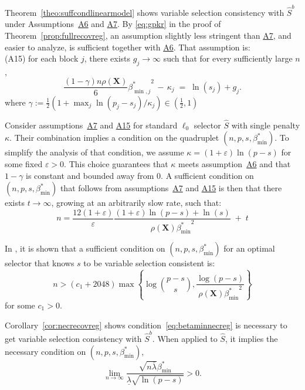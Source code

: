 \documentclass[bj,authoryear]{imsart}
\theoremstyle{plain}
\newcommand{\bs}{\boldsymbol}
\begin{document}
Theorem~\ref{theo:suffcondlinearmodel} shows variable selection consistency with $\hat{S}^b$ under Assumptions~\hyperlink{lab:A6}{A6} and \hyperlink{lab:A7}{A7}. By \eqref{eq:gpkr} in the proof of Theorem~\ref{prop:fullrecovreg}, an assumption slightly less stringent than \hyperlink{lab:A7}{A7}, and easier to analyze, is sufficient together with \hyperlink{lab:A6}{A6}. That assumption is: \\[5pt]
\noindent\hypertarget{lab:A15}{(A15)} \quad for each block $j$, there exists $g_j\to \infty$ such that for every sufficiently large $n$,
    \begin{equation*}
        \frac{(1-\gamma) n\rho(\bs X)}{6}{\beta_{\min,j}^*}^2 \,- \,\kappa_j \;=\; \ln(s_j) + g_j .
    \end{equation*}
where $\gamma:=\tfrac12(1+\max_j\ln(p_j-s_j)/\kappa_j)\in (\tfrac12,1)$

Consider assumptions~\hyperlink{lab:A7}{A7} and \hyperlink{lab:A15}{A15} for standard $\ell_0$ selector $\hat{S}$ with single penalty $\kappa$. Their combination implies a condition on the quadruplet $(n,p,s,\beta_{\min}^*)$. To simplify the analysis of that condition, we assume $\kappa=(1+\varepsilon)\ln(p-s)$ for some fixed $\varepsilon>0$. This choice guarantees that $\kappa$ meets assumption~\hyperlink{lab:A6}{A6} and that $1-\gamma$ is constant and bounded away from 0. A sufficient condition on $(n,p,s,\beta_{\min}^*)$ that follows from assumptions~\hyperlink{lab:A7}{A7} and \hyperlink{lab:A15}{A15} is then that there exists $t\to \infty$, growing at an arbitrarily slow rate, such that:
\begin{equation}\label{eq:groh}
    n= \frac{12(1+\varepsilon)}{\varepsilon}\frac{(1+\varepsilon)\ln(p-s)+\ln(s)}{\rho(\bs X){\beta_{\min}^*}^2} \;+\;t
\end{equation}

In \cite{infotheowainwright}, it is shown that a sufficient condition on $(n,p,s,\beta_{\min}^*)$ for an optimal selector that knows $s$ to be variable selection consistent is:
\begin{equation}\label{eq:groh2}
    n > (c_1+2048) \max \left\{\log \binom{p-s}{s}, \frac{\log (p-s)}{\rho(\bs X) {\beta_{\min}^*}^2}\right\}
\end{equation}
for some $c_1 >0$. 

Corollary~\ref{cor:necrecovreg} shows condition~\eqref{eq:betaminnecreg} is necessary to get variable selection consistency with $\hat{S}^b$. When applied to $\hat{S}$, it implies the necessary condition on $(n,p,s,\beta_{\min}^*)$,
\begin{equation}\label{eq:gpiR}
\lim_{n\to\infty}\frac{\sqrt{n\bar{\lambda}}\beta_{\min}^*}{\underline{\lambda}\sqrt{\ln(p-s)}} > 0.
\end{equation}
\end{document}
